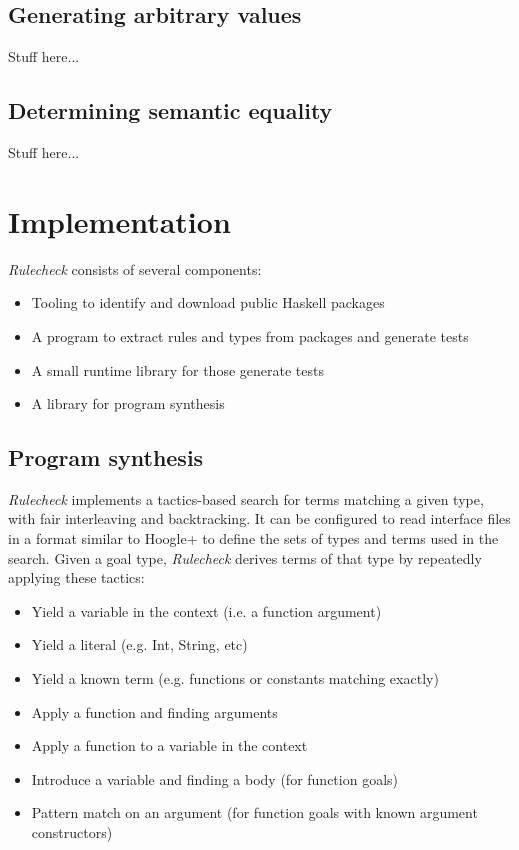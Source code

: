 \documentclass[format=sigconf, nonacm=true, review=true, screen=true]{acmart}
\newcommand{\Rulecheck}{\textit{Rulecheck}\xspace}
\begin{document}
\subsection{Generating arbitrary values}

Stuff here...

\subsection{Determining semantic equality}

Stuff here...

\section{Implementation}

\Rulecheck consists of several components:

\begin{itemize}
  \item Tooling to identify and download public Haskell packages
  \item A program to extract rules and types from packages and generate tests
  \item A small runtime library for those generate tests
  \item A library for program synthesis
\end{itemize}

\subsection{Program synthesis}

\Rulecheck implements a tactics-based search for terms matching a given type, with fair interleaving and backtracking. \cite{delahaye2000tactic, kiselyov2005backtracking} It can be configured to read interface files in a format similar to Hoogle+ \cite{james2020digging} to define the sets of types and terms used in the search. Given a goal type, \Rulecheck derives terms of that type by repeatedly applying these tactics:

\begin{itemize}
  \item Yield a variable in the context (i.e. a function argument)
  \item Yield a literal (e.g. Int, String, etc)
  \item Yield a known term (e.g. functions or constants matching exactly)
  \item Apply a function and finding arguments
  \item Apply a function to a variable in the context
  \item Introduce a variable and finding a body (for function goals)
  \item Pattern match on an argument (for function goals with known argument constructors)
\end{itemize}
\end{document}
